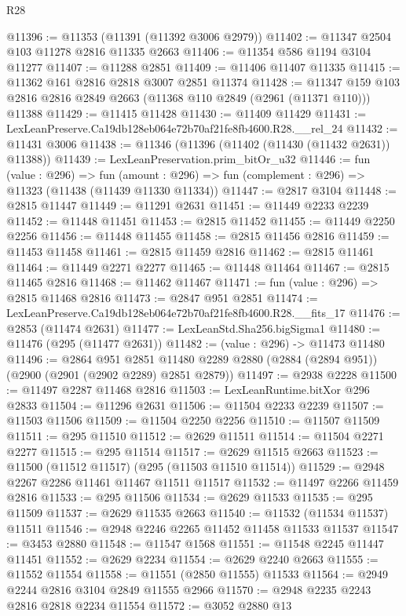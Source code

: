 \begin{lexlean}{R28}
\begin{coremodule}
@11396 := @11353 (@11391 (@11392 @3006 @2979))
@11402 := @11347 @2504 @103 @11278 @2816 @11335 @2663
@11406 := @11354 @586 @1194 @3104 @11277
@11407 := @11288 @2851
@11409 := @11406 @11407 @11335
@11415 := @11362 @161 @2816 @2818 @3007 @2851 @11374
@11428 := @11347 @159 @103 @2816 @2816 @2849 @2663 (@11368 @110 @2849 (@2961 (@11371 @110))) @11388
@11429 := @11415 @11428
@11430 := @11409 @11429
@11431 := LexLeanPreserve.Ca19db128eb064e72b70af21fe8fb4600.R28.__rel_24
@11432 := @11431 @3006
@11438 := @11346 (@11396 (@11402 (@11430 (@11432 @2631)) @11388))
@11439 := LexLeanPreservation.prim_bitOr_u32
@11446 := fun (value : @296) =>
  fun (amount : @296) => fun (complement : @296) => @11323 (@11438 (@11439 @11330 @11334))
@11447 := @2817 @3104
@11448 := @2815 @11447
@11449 := @11291 @2631
@11451 := @11449 @2233 @2239
@11452 := @11448 @11451
@11453 := @2815 @11452
@11455 := @11449 @2250 @2256
@11456 := @11448 @11455
@11458 := @2815 @11456 @2816
@11459 := @11453 @11458
@11461 := @2815 @11459 @2816
@11462 := @2815 @11461
@11464 := @11449 @2271 @2277
@11465 := @11448 @11464
@11467 := @2815 @11465 @2816
@11468 := @11462 @11467
@11471 := fun (value : @296) => @2815 @11468 @2816
@11473 := @2847 @951 @2851
@11474 := LexLeanPreserve.Ca19db128eb064e72b70af21fe8fb4600.R28.__fits_17
@11476 := @2853 (@11474 @2631)
@11477 := LexLeanStd.Sha256.bigSigma1
@11480 := @11476 (@295 (@11477 @2631))
@11482 := (value : @296) -> @11473 @11480
@11496 := @2864
    @951
    @2851
    @11480
    @2289
    @2880
    (@2884 (@2894 @951))
    (@2900 (@2901 (@2902 @2289) @2851 @2879))
@11497 := @2938 @2228
@11500 := @11497 @2287 @11468 @2816
@11503 := LexLeanRuntime.bitXor @296 @2833
@11504 := @11296 @2631
@11506 := @11504 @2233 @2239
@11507 := @11503 @11506
@11509 := @11504 @2250 @2256
@11510 := @11507 @11509
@11511 := @295 @11510
@11512 := @2629 @11511
@11514 := @11504 @2271 @2277
@11515 := @295 @11514
@11517 := @2629 @11515 @2663
@11523 := @11500 (@11512 @11517) (@295 (@11503 @11510 @11514))
@11529 := @2948 @2267 @2286 @11461 @11467 @11511 @11517
@11532 := @11497 @2266 @11459 @2816
@11533 := @295 @11506
@11534 := @2629 @11533
@11535 := @295 @11509
@11537 := @2629 @11535 @2663
@11540 := @11532 (@11534 @11537) @11511
@11546 := @2948 @2246 @2265 @11452 @11458 @11533 @11537
@11547 := @3453 @2880
@11548 := @11547 @1568
@11551 := @11548 @2245 @11447 @11451
@11552 := @2629 @2234
@11554 := @2629 @2240 @2663
@11555 := @11552 @11554
@11558 := @11551 (@2850 @11555) @11533
@11564 := @2949 @2244 @2816 @3104 @2849 @11555 @2966
@11570 := @2948 @2235 @2243 @2816 @2818 @2234 @11554
@11572 := @3052 @2880 @13

\end{coremodule}
\end{lexlean}
